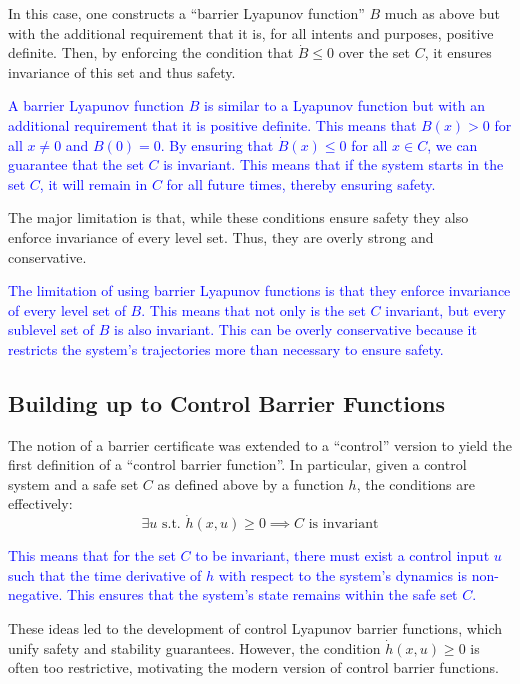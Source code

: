 \documentclass[12pt]{article}
\begin{document}
In this case, one constructs a “barrier Lyapunov function” \( B \) much as above but with the additional requirement that it is, for all intents and purposes, positive definite. Then, by enforcing the condition that \( \dot{B} \leq 0 \) over the set \( C \), it ensures invariance of this set and thus safety. 

\textcolor{blue}{
A barrier Lyapunov function \( B \) is similar to a Lyapunov function but with an additional requirement that it is positive definite. This means that \( B(x) > 0 \) for all \( x \neq 0 \) and \( B(0) = 0 \). By ensuring that \( \dot{B}(x) \leq 0 \) for all \( x \in C \), we can guarantee that the set \( C \) is invariant. This means that if the system starts in the set \( C \), it will remain in \( C \) for all future times, thereby ensuring safety.
}

The major limitation is that, while these conditions ensure safety they also enforce invariance of every level set. Thus, they are overly strong and conservative.

\textcolor{blue}{
The limitation of using barrier Lyapunov functions is that they enforce invariance of every level set of \( B \). This means that not only is the set \( C \) invariant, but every sublevel set of \( B \) is also invariant. This can be overly conservative because it restricts the system's trajectories more than necessary to ensure safety.
}

\subsection{Building up to Control Barrier Functions}
The notion of a barrier certificate was extended to a “control” version to yield the first definition of a “control barrier function”. In particular, given a control system and a safe set \( C \) as defined above by a function \( h \), the conditions are effectively:
\[
\exists u \text{ s.t. } \dot{h}(x, u) \geq 0 \implies C \text{ is invariant}
\]

\textcolor{blue}{
This means that for the set \( C \) to be invariant, there must exist a control input \( u \) such that the time derivative of \( h \) with respect to the system's dynamics is non-negative. This ensures that the system's state remains within the safe set \( C \).
}

These ideas led to the development of control Lyapunov barrier functions, which unify safety and stability guarantees. However, the condition \( \dot{h}(x, u) \geq 0 \) is often too restrictive, motivating the modern version of control barrier functions.
\end{document}
